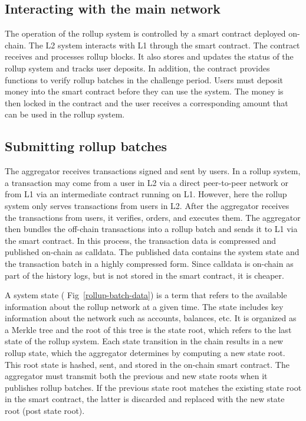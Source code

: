 \documentclass{article}
\begin{document}
\subsection{Interacting with the main network}
The operation of the rollup system is controlled by a smart contract deployed on- chain. The L2 system interacts with L1 through the smart contract. The contract receives and processes rollup blocks. It also stores and updates the status of the rollup system and tracks user deposits. In addition, the contract provides functions to verify rollup batches in the challenge period. Users must deposit money into the smart contract before they can use the system. The money is then locked in the contract and the user receives a corresponding amount that can be used in the rollup system.

\subsection{Submitting rollup batches}
The aggregator receives transactions signed and sent by users. In a rollup system, a transaction may come from a user in L2 via a direct peer-to-peer network or from L1 via an intermediate contract running on L1. However, here the rollup system only serves transactions from users in L2. After the aggregator receives the transactions from users, it verifies, orders, and executes them. The aggregator then bundles the off-chain transactions into a rollup batch and sends it to L1 via the smart contract. In this process, the transaction data is compressed and published on-chain as calldata. The published data contains the system state and the transaction batch in a highly compressed form. Since calldata is on-chain as part of the history logs, but is not stored in the smart contract, it is cheaper.

A system state ( Fig~\ref{rollup-batch-data}) is a term that refers to the available information about the rollup network at a given time. The state includes key information about the network such as accounts, balances, etc. It is organized as a Merkle tree and the root of this tree is the state root, which refers to the last state of the rollup system. Each state transition in the chain results in a new rollup state, which the aggregator determines by computing a new state root. This root state is hashed, sent, and stored in the on-chain smart contract. The aggregator must transmit both the previous and new state roots when it publishes rollup batches. If the previous state root matches the existing state root in the smart contract, the latter is discarded and replaced with the new state root (post state root).
\end{document}

